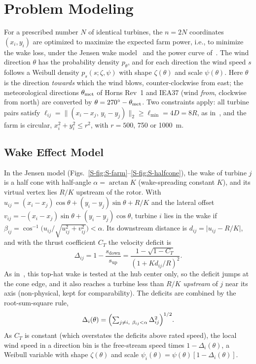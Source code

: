 \section{Problem Modeling}
\label{sec:model}

For a prescribed number $N$ of identical turbines, the $n=2N$ coordinates $(x_i,y_i)$ are optimized to maximize the expected farm power, i.e., to minimize the wake loss, under the Jensen wake model~\cite{Jensen1983,Katic1986} and the power curve of~\cite{Kusiak2010}. The wind direction $\theta$ has the probability density $p_\theta$, and for each direction the wind speed $s$ follows a Weibull density $p_s(s;\zeta,\psi)$ with shape $\zeta(\theta)$ and scale $\psi(\theta)$. Here $\theta$ is the direction \emph{towards} which the wind blows, counter-clockwise from east; the meteorological directions $\theta_{\rm met}$ of Horns Rev~1 and IEA37 (wind \emph{from}, clockwise from north) are converted by $\theta=270^\circ-\theta_{\rm met}$. Two constraints apply: all turbine pairs satisfy $\ell_{ij}=\lVert(x_i-x_j,\,y_i-y_j)\rVert_2\ge\ell_{\min}=4D=8R$, as in~\cite{Kusiak2010,Bansal2017}, and the farm is circular, $x_i^2+y_i^2\le r^2$, with $r=500$, 750 or 1000~m.

\subsection{Wake Effect Model}
In the Jensen model (Figs.~\ref{S-fig:S-farm}--\ref{S-fig:S-halfcone}), the wake of turbine $j$ is a half cone with half-angle $\alpha=\arctan K$ (wake-spreading constant $K$), and its virtual vertex lies $R/K$ upstream of the rotor. With $u_{ij}=(x_i - x_j)\cos\theta + (y_i - y_j)\sin\theta + R/K$ and the lateral offset $v_{ij}=-(x_i - x_j)\sin\theta + (y_i - y_j)\cos\theta$, turbine $i$ lies in the wake if $\beta_{ij}=\cos^{-1}\!\bigl(u_{ij}/\sqrt{u_{ij}^2+v_{ij}^2}\bigr)<\alpha$. Its downstream distance is $d_{ij}=\lvert u_{ij}-R/K\rvert$, and with the thrust coefficient $C_T$ the velocity deficit is
\begin{equation}
    \Delta_{ij} = 1-\frac{s_{\text{down}}}{s_{\text{up}}}=\frac{1 - \sqrt{1 - C_T}}{\left(1 + K d_{ij}/R\right)^2}.
    \label{eq:deficit}
\end{equation}
As in~\cite{Kusiak2010}, this top-hat wake is tested at the hub center only, so the deficit jumps at the cone edge, and it also reaches a turbine less than $R/K$ \emph{upstream} of $j$ near its axis (non-physical, kept for comparability). The deficits are combined by the root-sum-square rule,
\begin{equation}\label{eq5}
\Delta_i(\theta) = \Bigl( \textstyle\sum_{j \ne i,\ \beta_{ij} < \alpha} \Delta_{ij}^2 \Bigr)^{1/2} .
\end{equation}
As $C_T$ is constant (which overstates the deficits above rated speed), the local wind speed in a direction bin is the free-stream speed times $1-\Delta_i(\theta)$, a Weibull variable with shape $\zeta(\theta)$ and scale $\psi_i(\theta)=\psi(\theta)[1-\Delta_i(\theta)]$.

